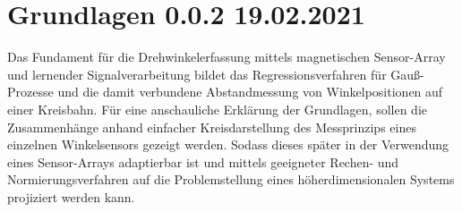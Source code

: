 %

\chapter{Grundlagen 0.0.2 19.02.2021}\label{ch:grundlagen}

Das Fundament für die Drehwinkelerfassung mittels magnetischen Sensor-Array und lernender Signalverarbeitung 
\cite{Schuethe2019}\cite{Schuethe2020a}\cite{Schuethe2020} bildet das Regressionsverfahren für Gauß-Prozesse 
\cite{Rasmussen2006} und die damit verbundene Abstandmessung von Winkelpositionen auf einer Kreisbahn.
Für eine anschauliche Erklärung der Grundlagen, sollen die Zusammenhänge anhand einfacher Kreisdarstellung des 
Messprinzips eines einzelnen Winkelsensors gezeigt werden. Sodass dieses später in der Verwendung eines Sensor-Arrays 
adaptierbar ist und mittels geeigneter Rechen- und Normierungsverfahren auf die Problemstellung eines 
höherdimensionalen Systems projiziert werden kann.





























